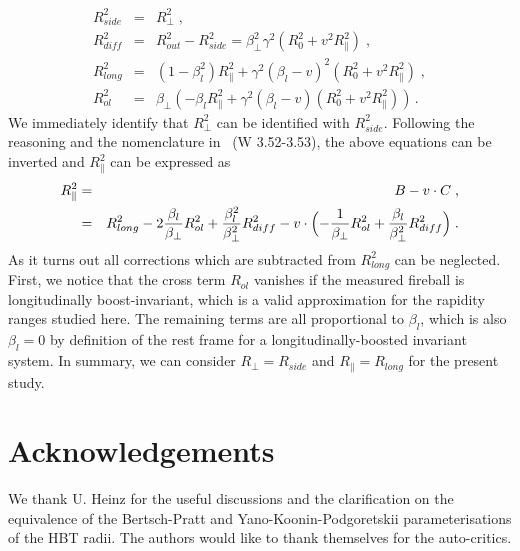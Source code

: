 \documentclass[a4paper,11pt]{scrartcl} %
\begin{document}
\begin{appendix}
\begin{eqnarray}
R_{side}^{2}    &=& R_{\perp}^{2}  \;, \\
R_{diff}^{2} &=& R_{out}^{2} -  R_{side}^{2} = \beta_{\perp}^2 \gamma^2 (R_{0}^2 + v^2R_{\parallel}^2) \;, \\
R_{long}^{2}     &=& (1 - \beta_l^2) R_{\parallel}^2 + \gamma^2 (\beta_l - v)^2 (R_{0}^2 + v^2R_{\parallel}^2) \;, \\
R_{ol}^{2}   &=& \beta_{\perp} (-\beta_l R_{\parallel}^{2} +  \gamma^2 (\beta_l - v)(R_{0}^2 + v^2R_{\parallel}^2)) \,.
\end{eqnarray}
%
We immediately identify that $R_{\perp}^2$ can be identified with $R_{side}^{2}$. Following the reasoning and the nomenclature in~\cite{Wiedemann:1999qn} (W 3.52-3.53), the above equations can be inverted and $R_{\parallel}^{2}$ can be expressed as 
%
\begin{eqnarray}
R_{\parallel}^{2} &=& B  - v \cdot C \;, \\
                          &=& R_{long}^2 - 2{\beta_l \over \beta_\perp}  R_{ol}^2 + {\beta_l^2 \over \beta_\perp^2} R_{diff}^2 
                          - v \cdot \Bigl(-{1 \over \beta_\perp } R_{ol}^2 + {\beta_l \over \beta_\perp^2} R_{diff}^2  \Bigr) \; .
\end{eqnarray}
%
As it turns out all corrections which are subtracted from $R_{long}^{2}$ can be neglected. First, we notice that the cross term $R_{ol}$ vanishes if the measured fireball is longitudinally boost-invariant, which is a valid approximation for the rapidity ranges studied here. The remaining terms are all proportional to $\beta_l$, which is also $\beta_l = 0$ by definition of the rest frame for a longitudinally-boosted invariant system. In summary, we can consider $R_{\perp} = R_{side}$ and $R_{\parallel}=R_{long}$ for the present study.
\end{appendix}


\newenvironment{acknowledgement}{\relax}{\relax}
\begin{acknowledgement}
\section*{Acknowledgements}
We thank U. Heinz for the useful discussions and the clarification on the equivalence of the Bertsch-Pratt and Yano-Koonin-Podgoretskii parameterisations of the HBT radii.
The authors would like to thank themselves for the auto-critics.

\end{acknowledgement}



 	

\end{document}
